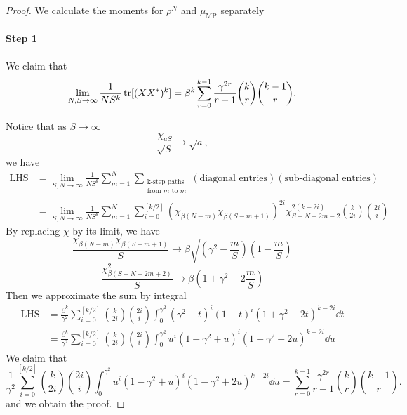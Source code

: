 \begin{proof} We calculate the moments for $\rho^N$ and $\mu_{\mathrm{MP}}$ separately
    \paragraph{Step 1} We claim that
    \[
    \lim_{N,S\to \infty} \frac{1}{NS^k}\operatorname{tr}[(XX^*)^k] = \beta^k \sum_{r=0}^{k-1} \frac{\gamma^{2r}}{r+1} \binom{k}{r} \binom{k-1}{r}.
    \]

    Notice that as $S\to \infty$
    \[
    \frac{\chi_{aS}}{\sqrt{S}} \to \sqrt{a},
    \]
    we have
    \begin{align*}
        \operatorname{LHS} &= \lim_{S,N\to\infty}\frac{1}{NS^k} \sum_{m=1}^N\sum_{\substack{\text{k-step paths} \\ \text{from } m \text{ to } m}} (\text{diagonal entries})(\text{sub-diagonal entries})\\
        &= \lim_{S,N\to \infty} \frac{1}{NS^k} \sum_{m=1}^N \sum_{i=0}^{[k/2]} \left(
        \chi_{\beta(N-m)}\chi_{\beta(S-m+1)}
        \right)^{2i}\chi_{S+N-2m-2}^{2(k-2i)} \binom{k}{2i}\binom{2i}{i}
    \end{align*}
    By replacing $\chi$ by its limit, we have
    \[
    \frac{\chi_{\beta(N-m)}\chi_{\beta(S-m+1)}}{S} \to \beta \sqrt{(\gamma^2-\frac{m}{S})(1-\frac{m}{S})}
    \]
    \[
    \frac{\chi^2_{\beta(S+N-2m+2)}}{S} \to \beta(1+\gamma^2 - 2\frac{m}{S})
    \]
    Then we approximate the sum by integral
    \begin{align*}
    \operatorname{LHS} 
    &= \frac{\beta^k}{\gamma^2} \sum_{i=0}^{[k/2]} \binom{k}{2i}\binom{2i}{i} \int_0^{\gamma^2} (\gamma^2-t)^i(1-t)^i (1+\gamma^2-2t)^{k-2i}\dd t\\
    &=\frac{\beta^k}{\gamma^2} \sum_{i=0}^{[k/2]} \binom{k}{2i}\binom{2i}{i} \int_0^{\gamma^2} u^i(1-\gamma^2+u)^i (1-\gamma^2+2u)^{k-2i}\dd u
    \end{align*}
    We claim that
    \[
    \frac{1}{\gamma^2}\sum_{i=0}^{[k/2]} \binom{k}{2i}\binom{2i}{i} \int_0^{\gamma^2} u^i(1-\gamma^2+u)^i (1-\gamma^2+2u)^{k-2i}\dd u = \sum_{r=0}^{k-1} \frac{\gamma^{2r}}{r+1} \binom{k}{r} \binom{k-1}{r}.
    \]
    and we obtain the proof.


\end{proof}
